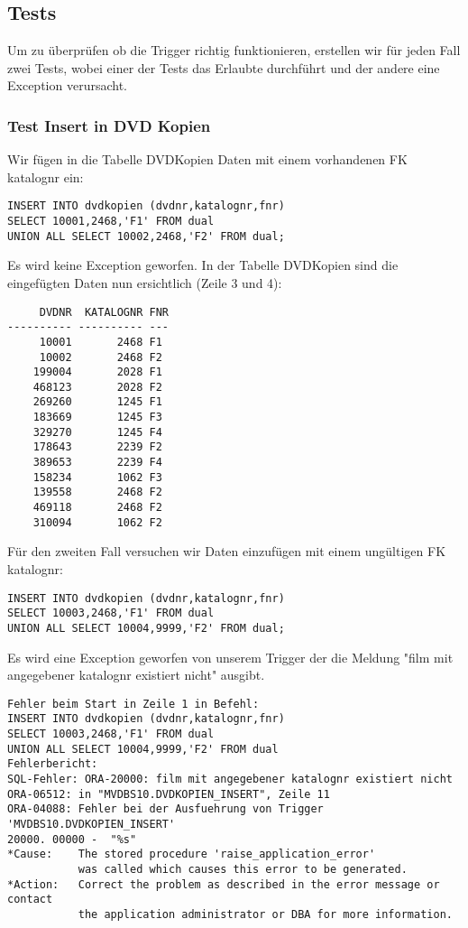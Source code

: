 \documentclass[11pt,a4paper,parskip=half]{scrartcl}
\begin{document}
\subsection{Tests}
Um zu überprüfen ob die Trigger richtig funktionieren, erstellen wir für jeden Fall zwei Tests, wobei einer der Tests das Erlaubte durchführt und der andere eine Exception verursacht.

\subsubsection{Test Insert in DVD Kopien}
Wir fügen in die Tabelle DVDKopien Daten mit einem vorhandenen FK katalognr ein:

\begin{lstlisting}
INSERT INTO dvdkopien (dvdnr,katalognr,fnr) 
SELECT 10001,2468,'F1' FROM dual 
UNION ALL SELECT 10002,2468,'F2' FROM dual;
\end{lstlisting}

Es wird keine Exception geworfen. In der Tabelle DVDKopien sind die eingefügten Daten nun ersichtlich (Zeile 3 und 4):

\begin{lstlisting}
     DVDNR  KATALOGNR FNR
---------- ---------- ---
     10001       2468 F1  
     10002       2468 F2  
    199004       2028 F1  
    468123       2028 F2  
    269260       1245 F1  
    183669       1245 F3  
    329270       1245 F4  
    178643       2239 F2  
    389653       2239 F4  
    158234       1062 F3  
    139558       2468 F2  
    469118       2468 F2  
    310094       1062 F2  
\end{lstlisting}

Für den zweiten Fall versuchen wir Daten einzufügen mit einem ungültigen FK katalognr:

\begin{lstlisting}
INSERT INTO dvdkopien (dvdnr,katalognr,fnr) 
SELECT 10003,2468,'F1' FROM dual 
UNION ALL SELECT 10004,9999,'F2' FROM dual;
\end{lstlisting}

Es wird eine Exception geworfen von unserem Trigger der die Meldung "film mit angegebener katalognr existiert nicht" ausgibt.

\begin{lstlisting}
Fehler beim Start in Zeile 1 in Befehl:
INSERT INTO dvdkopien (dvdnr,katalognr,fnr) 
SELECT 10003,2468,'F1' FROM dual 
UNION ALL SELECT 10004,9999,'F2' FROM dual
Fehlerbericht:
SQL-Fehler: ORA-20000: film mit angegebener katalognr existiert nicht
ORA-06512: in "MVDBS10.DVDKOPIEN_INSERT", Zeile 11
ORA-04088: Fehler bei der Ausfuehrung von Trigger 'MVDBS10.DVDKOPIEN_INSERT'
20000. 00000 -  "%s"
*Cause:    The stored procedure 'raise_application_error'
           was called which causes this error to be generated.
*Action:   Correct the problem as described in the error message or contact
           the application administrator or DBA for more information.
\end{lstlisting}
\end{document}
